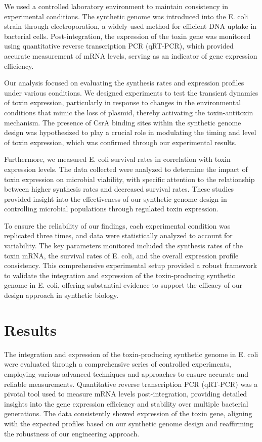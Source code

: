 \documentclass{article}
\begin{document}
We used a controlled laboratory environment to maintain consistency in experimental conditions. The synthetic genome was introduced into the E. coli strain through electroporation, a widely used method for efficient DNA uptake in bacterial cells. Post-integration, the expression of the toxin gene was monitored using quantitative reverse transcription PCR (qRT-PCR), which provided accurate measurement of mRNA levels, serving as an indicator of gene expression efficiency.

Our analysis focused on evaluating the synthesis rates and expression profiles under various conditions. We designed experiments to test the transient dynamics of toxin expression, particularly in response to changes in the environmental conditions that mimic the loss of plasmid, thereby activating the toxin-antitoxin mechanism. The presence of CsrA binding sites within the synthetic genome design was hypothesized to play a crucial role in modulating the timing and level of toxin expression, which was confirmed through our experimental results.

Furthermore, we measured E. coli survival rates in correlation with toxin expression levels. The data collected were analyzed to determine the impact of toxin expression on microbial viability, with specific attention to the relationship between higher synthesis rates and decreased survival rates. These studies provided insight into the effectiveness of our synthetic genome design in controlling microbial populations through regulated toxin expression.

To ensure the reliability of our findings, each experimental condition was replicated three times, and data were statistically analyzed to account for variability. The key parameters monitored included the synthesis rates of the toxin mRNA, the survival rates of E. coli, and the overall expression profile consistency. This comprehensive experimental setup provided a robust framework to validate the integration and expression of the toxin-producing synthetic genome in E. coli, offering substantial evidence to support the efficacy of our design approach in synthetic biology.

\section{Results}
The integration and expression of the toxin-producing synthetic genome in E. coli were evaluated through a comprehensive series of controlled experiments, employing various advanced techniques and approaches to ensure accurate and reliable measurements. Quantitative reverse transcription PCR (qRT-PCR) was a pivotal tool used to measure mRNA levels post-integration, providing detailed insights into the gene expression efficiency and stability over multiple bacterial generations. The data consistently showed expression of the toxin gene, aligning with the expected profiles based on our synthetic genome design and reaffirming the robustness of our engineering approach.
\end{document}
